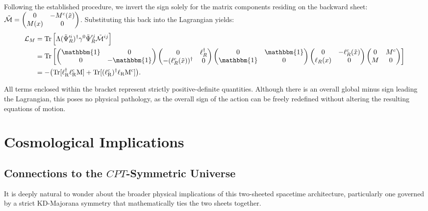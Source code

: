 Following the established procedure, we invert the sign solely for the matrix components residing on the backward sheet: $\tilde{\cal M}=\begin{pmatrix} 0 & -M^c(\tilde x) \\ M(x) & 0 \end{pmatrix}$.
Substituting this back into the Lagrangian yields: 
\begin{equation}
\begin{aligned}
    {\cal L}_{M}&={\rm Tr}\left[\Lambda({\tilde\Psi}_{R}'^{i})^\dagger\gamma^0\tilde\Psi_{R}'^{j}\tilde{\mathcal{M}}^{ij}\right] \\
    &={\rm Tr}\left[\begin{pmatrix} \mathbbm{1} & 0 \\ 0 & -\mathbbm{1} \end{pmatrix}\begin{pmatrix}0&\ell_R^\dagger\\ -(\ell_R^c(\tilde x))^\dagger &0 \end{pmatrix} \begin{pmatrix} 0 & \mathbbm{1} \\ \mathbbm{1}& 0 \end{pmatrix}\begin{pmatrix}0&-\ell_R^c(\tilde x)\\ \ell_R(x) &0 \end{pmatrix} \begin{pmatrix} 0 & M^c \\ M & 0 \end{pmatrix}\right] \\
    &=-\big(\rm Tr[\ell_R^\dagger\ell_R^c M]+\rm Tr[(\ell_R^c)^\dagger\ell_RM^c]\big).
\end{aligned}
\end{equation}

All terms enclosed within the bracket represent strictly positive-definite quantities. Although there is an overall global minus sign leading the Lagrangian, this poses no physical pathology, as the overall sign of the action can be freely redefined without altering the resulting equations of motion.

\vspace{0.25cm}
\section{Cosmological Implications}\label{sec:KD_cosmology}

\subsection{Connections to the $CPT$-Symmetric Universe }
It is deeply natural to wonder about the broader physical implications of this two-sheeted spacetime architecture, particularly one governed by a strict KD-Majorana symmetry that mathematically ties the two sheets together.

